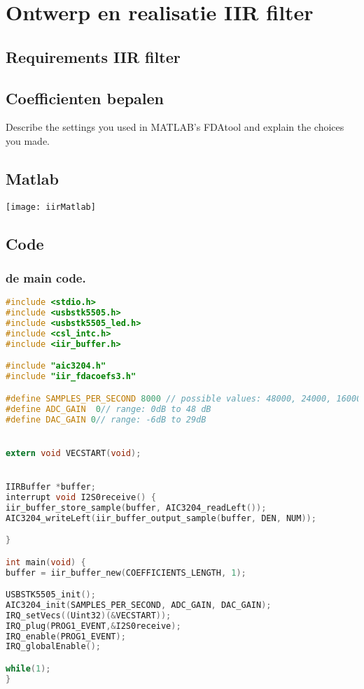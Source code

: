 \section{Ontwerp en realisatie IIR filter}

\subsection{Requirements IIR filter}

\subsection{Coefficienten bepalen}

\begin{enumerate}[label=\emph{\alph*)}]
     Describe the settings you 					used in MATLAB’s FDAtool and explain the 					choices you made.
\end{enumerate}

\subsection{Matlab}

\texttt{[image: iirMatlab]}\par\vspace{1cm}		

\subsection{Code}

\subsubsection{de main code.}
\begin{lstlisting}[language=c]
#include <stdio.h>
#include <usbstk5505.h>
#include <usbstk5505_led.h>
#include <csl_intc.h>
#include <iir_buffer.h>

#include "aic3204.h"
#include "iir_fdacoefs3.h"

#define SAMPLES_PER_SECOND 8000 // possible values: 48000, 24000, 16000, 12000, 9600, and 8000
#define ADC_GAIN  0// range: 0dB to 48 dB
#define DAC_GAIN 0// range: -6dB to 29dB


extern void VECSTART(void);


IIRBuffer *buffer;
interrupt void I2S0receive() {
iir_buffer_store_sample(buffer, AIC3204_readLeft());
AIC3204_writeLeft(iir_buffer_output_sample(buffer, DEN, NUM));

}

int main(void) {
buffer = iir_buffer_new(COEFFICIENTS_LENGTH, 1);

USBSTK5505_init();
AIC3204_init(SAMPLES_PER_SECOND, ADC_GAIN, DAC_GAIN);
IRQ_setVecs((Uint32)(&VECSTART));
IRQ_plug(PROG1_EVENT,&I2S0receive);
IRQ_enable(PROG1_EVENT);
IRQ_globalEnable();

while(1);
}
\end{lstlisting}
\clearpage

